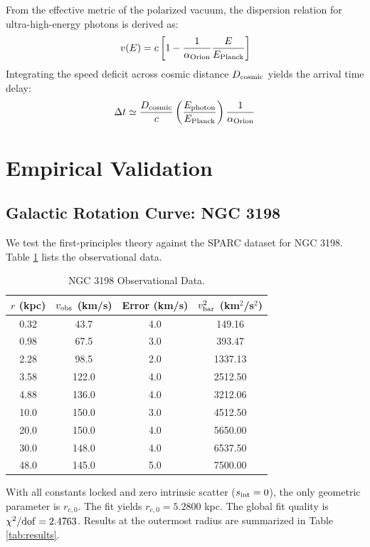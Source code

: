 \documentclass[twocolumn,aps,prd,superscriptaddress,nofootinbib]{revtex4-2}
\begin{document}
From the effective metric of the polarized vacuum, the dispersion relation for ultra-high-energy photons is derived as:
\begin{equation}
v(E) = c \left[ 1 - \frac{1}{\alpha_{\rm Orion}} \frac{E}{E_{\rm Planck}} \right]
\end{equation}
Integrating the speed deficit across cosmic distance \(D_{\rm cosmic}\) yields the arrival time delay:
\begin{equation}
\Delta t \simeq \frac{D_{\rm cosmic}}{c} \left( \frac{E_{\rm photon}}{E_{\rm Planck}} \right) \frac{1}{\alpha_{\rm Orion}}
\end{equation}

\section{Empirical Validation}
\subsection{Galactic Rotation Curve: NGC 3198}
We test the first-principles theory against the SPARC dataset \cite{SPARC} for NGC 3198. Table \ref{tab:data} lists the observational data.

\begin{table}[h]
\centering
\caption{NGC 3198 Observational Data.}
\label{tab:data}
\begin{tabular}{cccc}
\hline\hline
\(r\) (kpc) & \(v_{\rm obs}\) (km/s) & Error (km/s) & \(v_{\rm bar}^2\) (km\(^2\)/s\(^2\)) \\
\hline
0.32 & 43.7 & 4.0 & 149.16 \\
0.98 & 67.5 & 3.0 & 393.47 \\
2.28 & 98.5 & 2.0 & 1337.13 \\
3.58 & 122.0 & 4.0 & 2512.50 \\
4.88 & 136.0 & 4.0 & 3212.06 \\
10.0 & 150.0 & 3.0 & 4512.50 \\
20.0 & 150.0 & 4.0 & 5650.00 \\
30.0 & 148.0 & 4.0 & 6537.50 \\
48.0 & 145.0 & 5.0 & 7500.00 \\
\hline\hline
\end{tabular}
\end{table}

With all constants locked and zero intrinsic scatter (\(s_{\rm int}=0\)), the only geometric parameter is \(r_{c,0}\). The fit yields \(r_{c,0} = 5.2800\) kpc. The global fit quality is \(\chi^2/{\rm dof} = 2.4763\). Results at the outermost radius are summarized in Table \ref{tab:results}.
\end{document}
